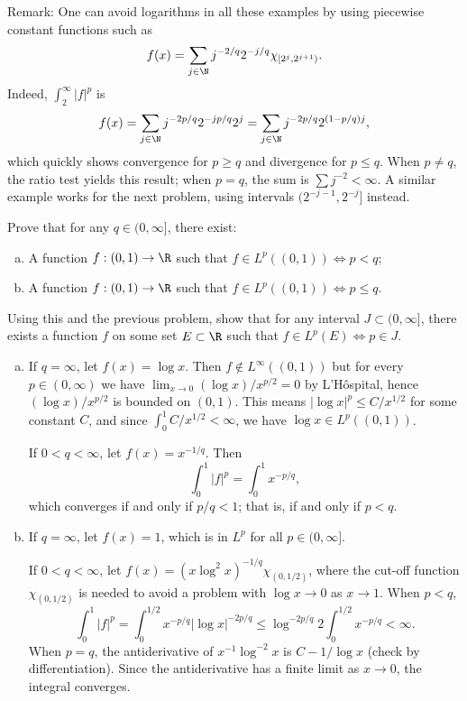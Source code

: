 \begin{hwsol}
\noindent Remark: One can avoid logarithms in all these examples by using piecewise constant functions such as 
        \[ 
        f(x)= \sum_{j \in \N} j^{-2/q} 2^{-j/q} \chi_{[2^j, 2^{j+1})}.
        \]
Indeed, $\int_2^\infty |f|^p$ is 
        \[ 
        f(x)= \sum_{j \in \N} j^{-2p/q} 2^{-jp/q} 2^j= \sum_{j \in \N} j^{-2p/q} 2^{(1-p/q)j},
        \]
which quickly shows convergence for $p \geq q$ and divergence for $p \leq q$. When $p \neq q$, the ratio test yields this result; when $p= q$, the sum is $\sum j^{-2}<\infty$. A similar example works for the next problem, using intervals $(2^{-j-1}, 2^{-j}]$ instead. \\
\end{hwsol}


\begin{hwsol}
Prove that for any $q \in (0, \infty]$, there exist:  
        \begin{enumerate}[(a)]
        \item A function $f: (0, 1) \to \R$ such that $f \in L^p((0, 1)) \iff p < q$;
        \item A function $f: (0, 1)  \to \R$ such that $f \in L^p((0, 1)) \iff p \leq q$.
        \end{enumerate}
Using this and the previous problem, show that for any interval $J \subset (0, \infty]$, there exists a function $f$ on some set $E \subset \R$ such that $f \in L^p(E) \iff p \in J$. \\

\pf \hfill
\begin{enumerate}[(a)]
\item If $q= \infty$, let $f(x)= \log x$. Then $f \notin L^\infty((0, 1))$ but for every $p \in (0, \infty)$ we have $\lim_{x \to 0} (\log x)/x^{p/2}= 0$ by L'H\^ospital, hence $(\log x)/x^{p/2}$ is bounded on $(0,1)$. This means $|\log x|^p \leq C/x^{1/2}$ for some constant $C$, and since $\int_0^1 C/x^{1/2} < \infty$, we have $\log x\in L^p((0, 1))$. 

If $0<  q < \infty$, let $f(x)= x^{-1/q}$. Then 
        \[
        \int_0^1 |f|^p= \int_0^1 x^{-p/q},
        \]
which converges if and only if $p/q<1$; that is, if and only if $p < q$. 

\item If $q= \infty$, let $f(x)= 1$, which is in $L^p$ for all $p \in (0, \infty]$. 

If $0< q < \infty$, let $f(x)= (x\log^2 x)^{-1/q}\chi_{(0, 1/2)}$, where the cut-off function 
$\chi_{(0, 1/2)}$ is needed to avoid a problem with $\log x \to0 $ as $x \to 1$. When $p < q$, 
        \[
        \int_0^{1} |f|^p= \int_0^{1/2} x^{-p/q} |\log x|^{-2p/q} \leq \log^{-2p/q} 2 \int_0^{1/2} x^{-p/q} < \infty.
        \]
When $p= q$, the antiderivative of $x^{-1} \log^{-2} x$ is $C-1/\log x$ (check by differentiation). Since the antiderivative has a finite limit as $x \to 0$, the integral converges.  


\end{enumerate}
\end{hwsol}
